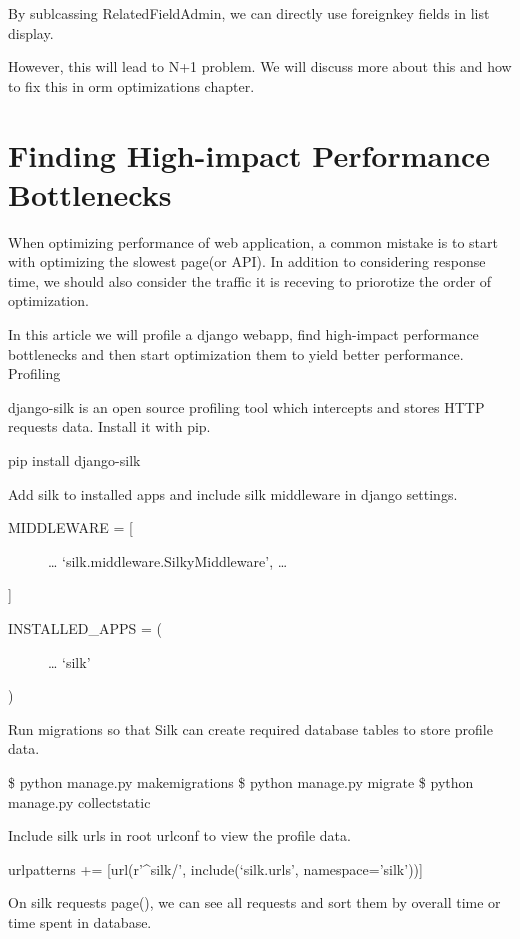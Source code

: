 \documentclass[a5paper,10pt,english]{sphinxmanual}
\begin{document}
By sublcassing RelatedFieldAdmin, we can directly use foreignkey fields in list display.

However, this will lead to N+1 problem. We will discuss more about this and how to fix this in orm optimizations chapter.


\chapter{Finding High-impact Performance Bottlenecks}
\label{\detokenize{misc_bottlenecks:finding-high-impact-performance-bottlenecks}}\label{\detokenize{misc_bottlenecks::doc}}
When optimizing performance of web application, a common mistake is to start with optimizing the slowest page(or API). In addition to considering response time, we should also consider the traffic it is receving to priorotize the order of optimization.

In this article we will profile a django webapp, find high-impact performance bottlenecks and then start optimization them to yield better performance.
Profiling

django-silk is an open source profiling tool which intercepts and stores HTTP requests data. Install it with pip.

pip install django-silk

Add silk to installed apps and include silk middleware in django settings.
\begin{description}
\item[{MIDDLEWARE = {[}}] \leavevmode
…
‘silk.middleware.SilkyMiddleware’,
…

\end{description}

{]}
\begin{description}
\item[{INSTALLED\_APPS = (}] \leavevmode
…
‘silk’

\end{description}

)

Run migrations so that Silk can create required database tables to store profile data.

\$ python manage.py makemigrations
\$ python manage.py migrate
\$ python manage.py collectstatic

Include silk urls in root urlconf to view the profile data.

urlpatterns += {[}url(r’\textasciicircum{}silk/’, include(‘silk.urls’, namespace=’silk’)){]}

On silk requests page(), we can see all requests and sort them by overall time or time spent in database.
\end{document}
